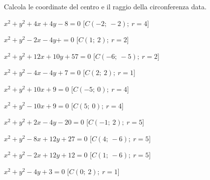 \begin{esercizio}\label{ese:}
 Calcola le coordinate del centro e il raggio della circonferenza data.
 \begin{enumeratea}
  \item  \(x^2 + y^2 +4x +4y -8 = 0\)
   \hfill [\(C \left (-2;~-2 \right );~r = 4\)]
  \item  \(x^2 + y^2 -2x -4y + = 0\)
   \hfill [\(C \left (1;~2 \right );~r = 2\)]
  \item  \(x^2 + y^2 +12x +10y +57 = 0\)
   \hfill [\(C \left (-6;~-5 \right );~r = 2\)]
  \item  \(x^2 + y^2 -4x -4y +7 = 0\)
   \hfill [\(C \left (2;~2 \right );~r = 1\)]
  \item  \(x^2 + y^2 +10x +9 = 0\)
   \hfill [\(C \left (-5;~0 \right );~r = 4\)]
  \item  \(x^2 + y^2 -10x +9 = 0\)
   \hfill [\(C \left (5;~0 \right );~r = 4\)]
  \item  \(x^2 + y^2 +2x -4y -20 = 0\)
   \hfill [\(C \left (-1;~2 \right );~r = 5\)]
  \item  \(x^2 + y^2 -8x +12y +27 = 0\)
   \hfill [\(C \left (4;~-6 \right );~r = 5\)]
  \item  \(x^2 + y^2 -2x +12y +12 = 0\)
   \hfill [\(C \left (1;~-6 \right );~r = 5\)]
  \item  \(x^2 + y^2 -4y +3 = 0\)
   \hfill [\(C \left (0;~2 \right );~r = 1\)]
 \end{enumeratea}
\end{esercizio}


\subsubsection*{}

